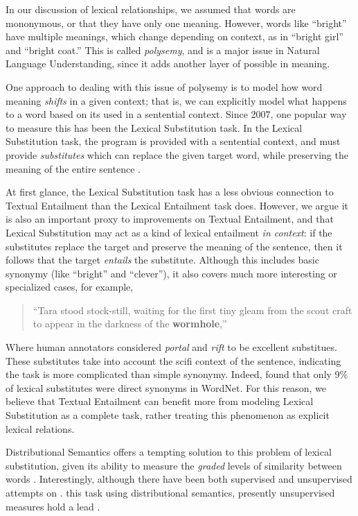 \documentclass[12pt]{article}
\begin{document}
In our discussion of lexical relationships, we assumed that words are
mononymous, or that they have only one meaning. However, words like ``bright''
have multiple meanings, which change depending on context, as in ``bright
girl'' and ``bright coat.'' This is called {\em polysemy}, and is a major issue
in Natural Language Understanding, since it adds another layer of possible in
meaning.

One approach to dealing with this issue of polysemy is to model how word
meaning {\em shifts} in a given context; that is, we can explicitly model what
happens to a word based on its used in a sentential context. Since 2007, one
popular way to measure this has been the Lexical Substitution task.  In the
Lexical Substitution task, the program is provided with a sentential context,
and must provide {\em substitutes} which can replace the given target word,
while preserving the meaning of the entire sentence
\cite{mccarthy:2007:semeval,biemann:2012:lrec,kremer:2014:eacl}.

At first glance, the Lexical Substitution task has a less obvious connection to
Textual Entailment than the Lexical Entailment task does. However, we argue
it is also an important proxy to improvements on Textual Entailment, and that
Lexical Substitution may act as a kind of lexical entailment {\em
in context}: if the substitutes replace the target and preserve the meaning of
the sentence, then it follows that the target {\em entails} the substitute.
Although this includes basic synonymy (like ``bright'' and ``clever''), it
also covers much more interesting or specialized cases, for example,
\begin{quote}
  ``Tara stood stock-still, waiting for the first tiny gleam from the
  scout craft to appear in the darkness of the {\bf wormhole},''
\end{quote}
Where human annotators considered {\em portal} and {\em rift} to be excellent
substitues. These substitutes take into account the scifi context of the
sentence, indicating the task is more complicated than simple synonymy. Indeed,
 found that only 9\% of lexical substitutes were
direct synonyms in WordNet.  For this reason, we believe that Textual
Entailment can benefit more from modeling Lexical Substitution as a complete
task, rather treating this phenomenon as explicit lexical relations.

Distributional Semantics offers a tempting solution to this problem of lexical
substitution, given its ability to measure the {\em graded} levels of similarity
between words \cite{erk:2008:emnlp}. Interestingly, although there have been
both supervised \cite{biemann:2012:lrec,szarvas:2013:naacl} and unsupervised
attempts on
\cite{erk:2008:emnlp,dinu:2010:emnlp,thater:2010:acl,vandecruys:2011:emnlp,kremer:2014:eacl,melamud:2015:naacl,melamud:2015:vsm,kawakami:2016:iclr,roller:2016:naacl}.
this task using distributional semantics, presently unsupervised measures hold
a lead \cite{melamud:2015:naacl,melamud:2016:conll}.
\end{document}
